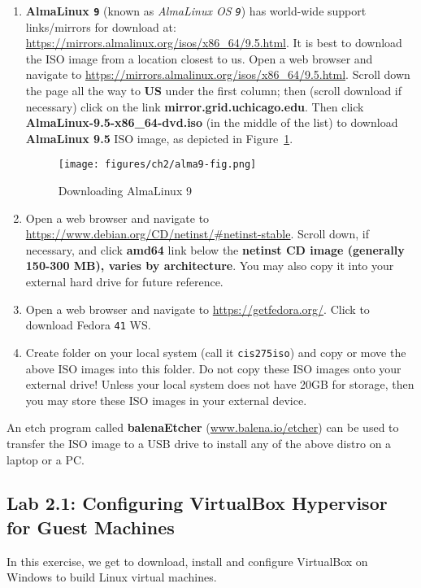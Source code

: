 \begin{enumerate}
\item {\bf{AlmaLinux {\tt{9}}}} (known as {\it{AlmaLinux OS {\tt{9}}}}) has world-wide support links/mirrors for download at: {\url{https://mirrors.almalinux.org/isos/x86_64/9.5.html}}. It is best to download the ISO image from a location closest to us. Open a web browser and navigate to {\url{https://mirrors.almalinux.org/isos/x86_64/9.5.html}}. Scroll down the page all the way to {\bf{US}} under the first column; then (scroll download if necessary) click on the link {\bf{mirror.grid.uchicago.edu}}. Then click {\bf{AlmaLinux-9.5-x86\_64-dvd.iso}} (in the middle of the list) to download {\bf{AlmaLinux 9.5}} ISO image, as depicted in Figure~\ref{fig:alma9OS}.
\begin{figure}[hbt!]\centering
   \texttt{[image: figures/ch2/alma9-fig.png]}
   \caption{Downloading AlmaLinux 9}\label{fig:alma9OS} %
\end{figure}

\item Open a web browser and navigate to {\url{https://www.debian.org/CD/netinst/#netinst-stable}}. Scroll down, if necessary, and click {\bf{amd64}} link below the {\bf{netinst CD image (generally 150-300 MB), varies by architecture}}. You may also copy it into your external hard drive for future reference.

\item Open a web browser and navigate to {\url{https://getfedora.org/}}. Click to download Fedora {\tt{41}} WS. 

\item Create folder on your local system (call it {\tt{cis275iso}}) and copy or move the above ISO images into this folder. Do not copy these ISO images onto your external drive! Unless your local system does not have 20GB for storage, then you may store these ISO images in your external device. 

\end{enumerate}

An etch program called {\bf{balenaEtcher}} ({\url{www.balena.io/etcher}}) can be used to transfer the ISO image to a USB drive to install any of the above distro on a laptop or a PC.  

\subsection*{Lab 2.1: Configuring VirtualBox Hypervisor for Guest Machines}
In this exercise, we get to download, install and configure VirtualBox on Windows to build Linux virtual machines. 

